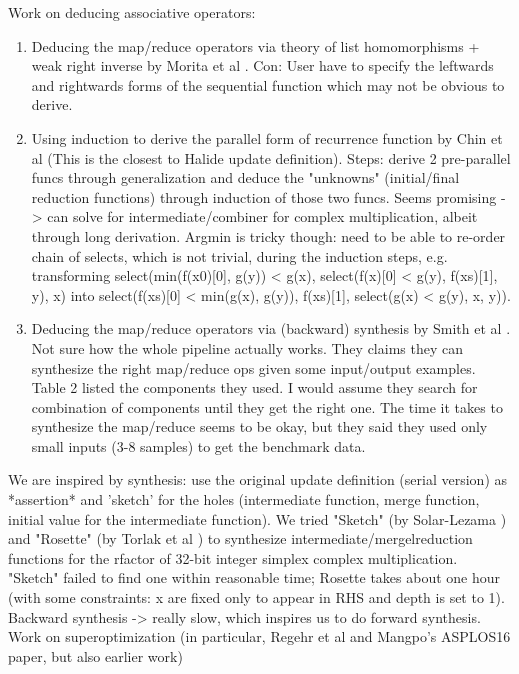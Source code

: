 Work on deducing associative operators: \\
\begin{enumerate}
	\item Deducing the map/reduce operators via theory of list homomorphisms + weak right inverse by Morita et al \cite{Morita:2007:AIG:1250734.1250752}. Con: User have to specify the leftwards and rightwards forms of the sequential function which may not be obvious to derive.
	\item Using induction to derive the parallel form of recurrence function by Chin et al \cite{Teo:1997:DEP:266670.266697} (This is the closest to Halide update definition). Steps: derive 2 pre-parallel funcs through generalization and deduce the "unknowns" (initial/final reduction functions) through induction of those two funcs. Seems promising -> can solve for intermediate/combiner for complex multiplication, albeit through long derivation. Argmin is tricky though: need to be able to re-order chain of selects, which is not trivial, during the induction steps, e.g. transforming select(min(f(x0)[0], g(y)) < g(x), select(f(x)[0] < g(y), f(xs)[1], y), x) into select(f(xs)[0] < min(g(x), g(y)), f(xs)[1], select(g(x) < g(y), x, y)).
	\item Deducing the map/reduce operators via (backward) synthesis by Smith et al \cite{Smith:2016:MPS:2908080.2908102}. Not sure how the whole pipeline actually works. They claims they can synthesize the right map/reduce ops given some input/output examples. Table 2 listed the components they used. I would assume they search for combination of components until they get the right one. The time it takes to synthesize the map/reduce seems to be okay, but they said they used only small inputs (3-8 samples) to get the benchmark data. \\
\end{enumerate}

We are inspired by synthesis: use the original update definition (serial version) as *assertion* and 'sketch' for the holes (intermediate function, merge function, initial value for the intermediate function). We tried "Sketch" (by Solar-Lezama \cite{Solar-Lezama:2008:PSS:1714168}) and "Rosette" (by Torlak et al \cite{Torlak:2013:GSL:2509578.2509586}) to synthesize intermediate/mergelreduction functions for the rfactor of 32-bit integer simplex complex multiplication. "Sketch" failed to find one within reasonable time; Rosette takes about one hour (with some constraints: x are fixed only to appear in RHS and depth is set to 1). Backward synthesis -> really slow, which inspires us to do forward synthesis.\\

Work on superoptimization (in particular, Regehr et al and Mangpo's ASPLOS16 paper, but also earlier work)

